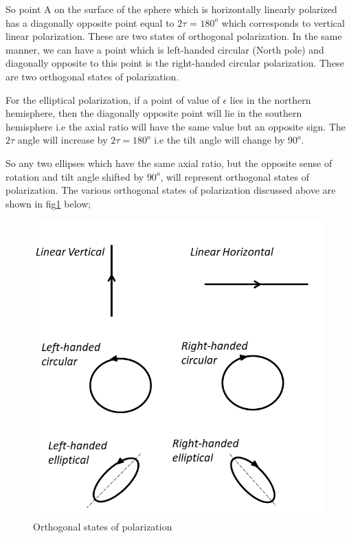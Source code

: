 So point A on the surface of the sphere which is horizontally linearly polarized has a diagonally opposite point equal to $2\tau$ = $180^{o}$ which corresponds to vertical linear polarization. These are two states of orthogonal polarization. In the same manner, we can have a point which is left-handed circular (North pole) and diagonally opposite to this point is the right-handed circular polarization. These are two orthogonal states of polarization.

For the elliptical polarization, if a point of value of $\epsilon$ lies in the northern hemisphere, then the diagonally opposite point will lie in the southern hemisphere i.e the axial ratio will have the same value but an opposite sign. The $2\tau$ angle will increase by $2\tau = 180^{o}$ i.e the tilt angle will change by $90^{o}$.

So any two ellipses which have the same axial ratio, but the opposite sense of rotation and tilt angle shifted by $90^{o}$, will represent orthogonal states of polarization. The various orthogonal states of polarization discussed above are shown in fig\ref{fig:orthogonal states of polarization} below;

\begin{figure}[h]
	\centering
	\includegraphics[width=0.9\linewidth]{"./graphics/orthogonal_states"}
	\caption{Orthogonal states of polarization}
	\label{fig:orthogonal states of polarization}
\end{figure}


